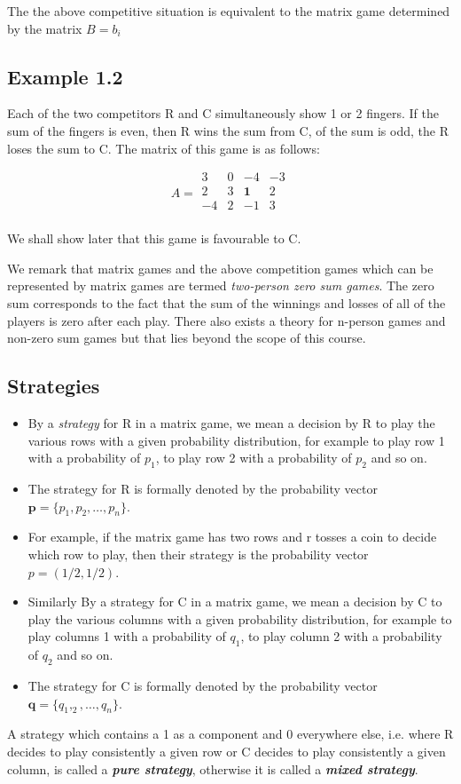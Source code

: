 \documentclass[]{report}
\begin{document}
The the above competitive situation is equivalent to the matrix game determined by the matrix $B=b_{i}$
\subsection{Example 1.2}
Each of the two competitors R and C simultaneously show 1 or 2 fingers. If the sum of the fingers is even, then R wins the sum from C, of the sum is odd, the R loses the sum to C. The matrix of this game is as follows:

\[
A = 
\begin{array}{cccc}
3 & 0 & -4 & -3 \\
2 & 3 & \boldsymbol{1} & 2 \\
-4 & 2 & -1 & 3 \\
\end{array}
\]

We shall show later that this game is favourable to C.

We remark that matrix games and the above competition games which can be represented
by matrix games are termed \textit{two-person zero sum games}.
The zero sum corresponds to the fact that the sum of the winnings and losses of all of the players
is zero after each play.
There also exists a theory for n-person games and non-zero sum games but that lies beyond the scope of this course.
\subsection{Strategies}
\begin{itemize}
\item By a \textit{strategy} for R in a matrix game, we mean a decision by R to play the various rows with a given probability distribution, for example
 to play row 1 with a probability of $p_1$, to play row 2 with a probability of $p_2$ and so on.
\item The strategy for R is formally denoted by the probability vector $\boldsymbol{p} = \{p_1,p_2,\ldots,p_n\}$.
\item For example, if the matrix game has two rows and r tosses a coin to decide which row to play, then their strategy is the probability vector $p=(1/2,1/2)$.
\item Similarly By a strategy for C in a matrix game, we mean a decision by C to play the various columns with a given probability distribution, for example
 to play columns 1 with a probability of $q_1$, to play column 2 with a probability of $q_2$ and so on.
\item The strategy for C is formally denoted by the probability vector $\boldsymbol{q} = \{q_1,_2,\ldots,q_n\}$.
\end{itemize}
A strategy which contains a 1 as a component and 0 everywhere else, i.e. where R decides to play consistently a given 
row or C decides to play consistently a given column, is called a \textbf{\textit{pure strategy}}, otherwise it is called a \textbf{\textit{mixed strategy}}.
\end{document}
